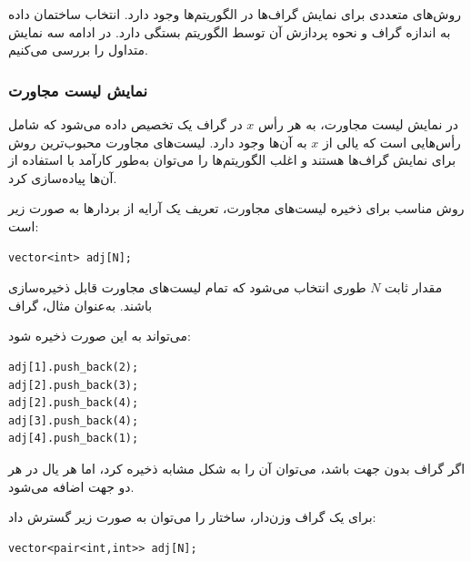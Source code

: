 روش‌های متعددی برای نمایش گراف‌ها
در الگوریتم‌ها وجود دارد.
انتخاب ساختمان داده
به اندازه گراف و
نحوه پردازش آن توسط الگوریتم بستگی دارد.
در ادامه سه نمایش متداول را بررسی می‌کنیم.

\subsubsection{نمایش لیست مجاورت}


در نمایش لیست مجاورت،
به هر رأس $x$ در گراف یک  تخصیص داده می‌شود
که شامل رأس‌هایی است
که یالی از $x$ به آن‌ها وجود دارد.
لیست‌های مجاورت محبوب‌ترین روش
برای نمایش گراف‌ها هستند و اغلب الگوریتم‌ها را می‌توان
به‌طور کارآمد با استفاده از آن‌ها پیاده‌سازی کرد.

روش مناسب برای ذخیره لیست‌های مجاورت، تعریف
یک آرایه از بردارها به صورت زیر است:
\begin{lstlisting}
vector<int> adj[N];
\end{lstlisting}

مقدار ثابت $N$ طوری انتخاب می‌شود که تمام
لیست‌های مجاورت قابل ذخیره‌سازی باشند.
به‌عنوان مثال، گراف

\begin{center}
\end{center}
می‌تواند به این صورت ذخیره شود:
\begin{lstlisting}
adj[1].push_back(2);
adj[2].push_back(3);
adj[2].push_back(4);
adj[3].push_back(4);
adj[4].push_back(1);
\end{lstlisting}

اگر گراف بدون جهت باشد، می‌توان آن را به شکل مشابه ذخیره کرد،
اما هر یال در هر دو جهت اضافه می‌شود.

برای یک گراف وزن‌دار، ساختار را می‌توان
به صورت زیر گسترش داد:

\begin{lstlisting}
vector<pair<int,int>> adj[N];
\end{lstlisting}

